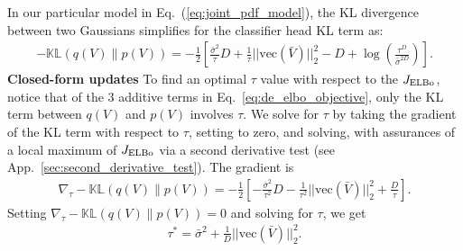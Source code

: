 In our particular model in Eq.~(\ref{eq:joint_pdf_model}), the KL divergence between two Gaussians \citep{murphy2022Example} simplifies for the classifier head KL term as:
\begin{align}
    -\mathbb{KL}(q(V) \| p(V)) = -\frac{1}{2} \left[ \frac{\bar{\sigma}^2}{\tau} D + \frac{1}{\tau} || \text{vec}(\bar{V}) ||_2^2 - D + \log \left( \frac{\tau^{D}}{\bar{\sigma}^{2D}} \right)\right].
\end{align}
\textbf{Closed-form updates}
To find an optimal $\tau$ value with respect to the $J_{\text{ELBo}}$, notice that of the 3 additive terms in Eq.~\eqref{eq:de_elbo_objective}, only the KL term between $q(V)$ and $p(V)$ involves $\tau$. We solve for $\tau$ by taking the gradient of the KL term with respect to $\tau$, setting to zero, and solving, with assurances of a local maximum of $J_{\text{ELBo}}$ via a second derivative test (see App.~\ref{sec:second_derivative_test}). The gradient is
\begin{align}
    \nabla_\tau -\mathbb{KL}(q(V) \| p(V)) = -\frac{1}{2} \left[ - \frac{\bar{\sigma}^2}{\tau^2} D - \frac{1}{\tau^2} || \text{vec}(\bar{V}) ||_2^2 + \frac{D}{\tau} \right].
\end{align}
Setting $\nabla_\tau -\mathbb{KL}(q(V) \| p(V)) = 0$ and solving for $\tau$, we get 
\begin{align}
    \tau^* = \bar{\sigma}^2 + \frac{1}{D} || \text{vec}(\bar{V}) ||_2^2.
\end{align}
